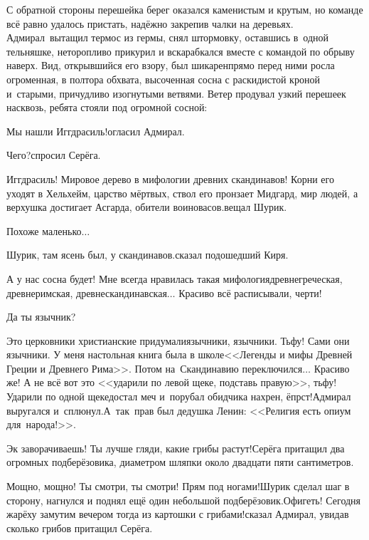 С обратной стороны перешейка берег оказался каменистым и крутым, но команде всё равно удалось пристать, надёжно закрепив чалки на деревьях. Адмирал~вытащил термос из гермы, снял штормовку, оставшись в~одной тельняшке, неторопливо прикурил и вскарабкался вместе с командой по обрыву наверх. Вид, открывшийся его взору, был шикарен\mdash прямо перед ними росла огроменная, в полтора обхвата, высоченная сосна с раскидистой кроной и~старыми, причудливо изогнутыми ветвями. Ветер продувал узкий перешеек насквозь, ребята стояли под огромной сосной:

\diagdash Мы нашли Иггдрасиль!\mdash огласил Адмирал.

\diagdash Чего?\mdash спросил Серёга.

\diagdash Иггдрасиль! Мировое дерево в мифологии древних скандинавов! Корни его уходят в Хельхейм, царство мёртвых, ствол его пронзает Мидгард, мир людей, а верхушка достигает Асгарда, обители воинов\sdash асов.\mdash вещал Шурик. 

\diagdash Похоже маленько$\ldots$

\diagdash Шурик, там ясень был, у скандинавов.\mdash сказал подошедший Киря.

\diagdash А у нас сосна будет! Мне всегда нравилась такая мифология\mdash древнегреческая, древнеримская, древнескандинавская$\ldots$ Красиво всё расписывали, черти!

\diagdash Да ты язычник?

\diagdash Это церковники христианские придумали\mdash язычники, язычники. Тьфу! Сами они язычники. У меня настольная книга была в школе\mdash <<Легенды и мифы Древней Греции и Древнего Рима>>\cite{Кун}. Потом на~Скандинавию переключился$\ldots$ Красиво же! А не всё вот это <<ударили по левой щеке, подставь правую>>, тьфу! Ударили по одной щеке\mdash достал меч и~порубал обидчика нахрен, ёпрст!\mdash Адмирал выругался и~сплюнул.\mdash А~так~прав был дедушка Ленин: <<Религия есть  опиум для~народа!>>\cite{ЛенинОпиумДляНарода}. 

\diagdash Эк заворачиваешь! Ты лучше гляди, какие грибы растут!\mdash Серёга притащил два огромных подберёзовика, диаметром шляпки около двадцати пяти сантиметров.  

\diagdash Мощно, мощно! Ты смотри, ты смотри! Прям под ногами!\mdash Шурик сделал шаг в сторону, нагнулся и поднял ещё один небольшой подберёзовик.\mdash Офигеть! Сегодня жарёху замутим вечером тогда из картошки с грибами!\mdash сказал Адмирал, увидав сколько грибов притащил Серёга. 


